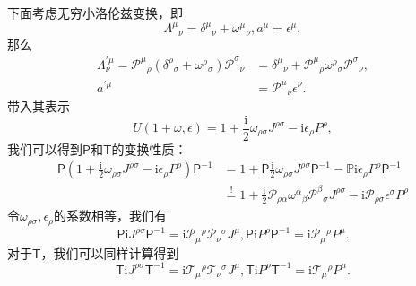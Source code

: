 下面考虑无穷小洛伦兹变换，即
\begin{equation*}
	\Lambda ^{\mu }{}_{\nu } =\delta ^{\mu }{}_{\nu } +\omega ^{\mu }{}_{\nu } ,a^{\mu } =\epsilon ^{\mu } ,
\end{equation*}
那么
\begin{equation*}
	\begin{aligned}
		\Lambda ^{\prime \mu }_{\nu } =\mathscr{P}^{\mu }{}_{\rho }\mathscr{(\delta ^{\rho }{}_{\sigma } +\omega ^{\rho }{}_{\sigma } )P}^{\sigma }{}_{\nu } & =\delta ^{\mu }{}_{\nu } +\mathscr{P}^{\mu }{}_{\rho }\mathscr{\omega ^{\rho }{}_{\sigma } P}^{\sigma }{}_{\nu } ,\\
		a^{\prime \mu } & =\mathscr{P}^{\mu }{}_{\nu } \epsilon ^{\nu } .
	\end{aligned}
\end{equation*}
带入其表示
\begin{equation*}
	U( 1+\omega ,\epsilon ) =1+\frac{\mathrm{i}}{2} \omega _{\rho \sigma } J^{\rho \sigma } -\mathrm{i} \epsilon _{\rho } P^{\rho } ,
\end{equation*}
我们可以得到$\mathsf{P}$和$\mathsf{T}$的变换性质：
\begin{equation*}
	\begin{aligned}
		\mathsf{P} (1+\frac{\mathrm{i}}{2} \omega _{\rho \sigma } J^{\rho \sigma } -\mathrm{i} \epsilon _{\rho } P^{\rho } )\mathsf{P}^{-1} & =1+\mathsf{P}\frac{\mathrm{i}}{2} \omega _{\rho \sigma } J^{\rho \sigma }\mathsf{P}^{-1} -\mathbb{P}\mathrm{i} \epsilon _{\rho } P^{\rho }\mathsf{P}^{-1}\\
		& \stackrel{!}{=} 1+\frac{\mathrm{i}}{2}\mathscr{P}_{\rho \alpha }\mathscr{\omega ^{\alpha }{}_{\beta } P}^{\beta }{}_{\sigma } J^{\rho \sigma } -\mathrm{i}\mathscr{P}_{\rho \sigma } \epsilon ^{\sigma } P^{\rho }
	\end{aligned}
\end{equation*}
令$\omega _{\rho \sigma } ,\epsilon _{\rho }$的系数相等，我们有
\begin{equation*}
	\mathsf{P}\mathrm{i} J^{\rho \sigma }\mathsf{P}^{-1} =\mathrm{i}\mathscr{P}{_{\mu }}\mathscr{^{\rho } P}{_{\nu }}^{\sigma } J^{\mu } ,\mathsf{P}\mathrm{i} P^{\rho }\mathsf{P}^{-1} =\mathrm{i}\mathscr{P}{_{\mu }}^{\rho } P^{\mu } .
\end{equation*}
对于$\mathsf{T}$，我们可以同样计算得到
\begin{equation*}
	\mathsf{T}\mathrm{i} J^{\rho \sigma }\mathsf{T}^{-1} =\mathrm{i}\mathscr{T}{_{\mu }}\mathscr{^{\rho } T}{_{\nu }}^{\sigma } J^{\mu } ,\mathsf{T}\mathrm{i} P^{\rho }\mathsf{T}^{-1} =\mathrm{i}\mathscr{T}{_{\mu }}^{\rho } P^{\mu } .
\end{equation*}

